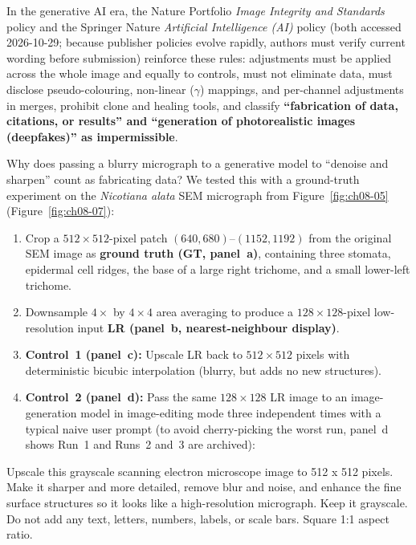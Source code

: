 In the generative AI era, the Nature Portfolio \emph{Image Integrity and Standards} policy and the Springer Nature \emph{Artificial Intelligence (AI)} policy (both accessed 2026-10-29; because publisher policies evolve rapidly, authors must verify current wording before submission) reinforce these rules: adjustments must be applied across the whole image and equally to controls, must not eliminate data, must disclose pseudo-colouring, non-linear ($\gamma$) mappings, and per-channel adjustments in merges, prohibit clone and healing tools, and classify \textbf{``fabrication of data, citations, or results'' and ``generation of photorealistic images (deepfakes)'' as impermissible}.

Why does passing a blurry micrograph to a generative model to ``denoise and sharpen'' count as fabricating data? We tested this with a ground-truth experiment on the \emph{Nicotiana alata} SEM micrograph from Figure~\ref{fig:ch08-05} (Figure~\ref{fig:ch08-07}):
\begin{enumerate}
\item Crop a $512 \times 512$-pixel patch $(640, 680)\text{--}(1152, 1192)$ from the original SEM image as \textbf{ground truth (GT, panel~a)}, containing three stomata, epidermal cell ridges, the base of a large right trichome, and a small lower-left trichome.
\item Downsample $4\times$ by $4 \times 4$ area averaging to produce a $128 \times 128$-pixel low-resolution input \textbf{LR (panel~b, nearest-neighbour display)}.
\item \textbf{Control~1 (panel~c):} Upscale LR back to $512 \times 512$ pixels with deterministic bicubic interpolation (blurry, but adds no new structures).
\item \textbf{Control~2 (panel~d):} Pass the same $128 \times 128$ LR image to an image-generation model in image-editing mode three independent times with a typical naive user prompt (to avoid cherry-picking the worst run, panel~d shows Run~1 and Runs~2 and~3 are archived):
\end{enumerate}

\begin{Prompt}
Upscale this grayscale scanning electron microscope image to 512 x 512 pixels.
Make it sharper and more detailed, remove blur and noise, and enhance the fine
surface structures so it looks like a high-resolution micrograph.
Keep it grayscale. Do not add any text, letters, numbers, labels, or scale bars.
Square 1:1 aspect ratio.
\end{Prompt}

